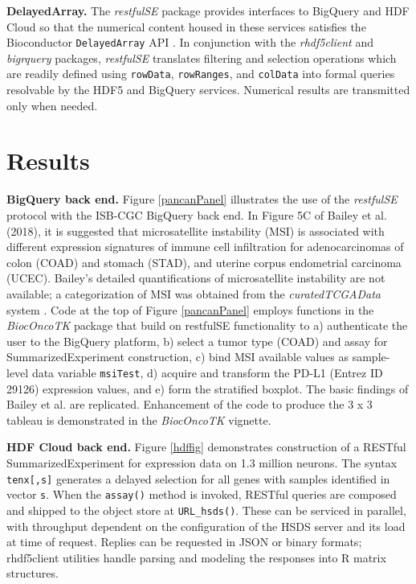 \documentclass[applications]{gen-bioinformatics}
\newcommand{\Rpackage}[1]{{\textit{#1}}}
\begin{document}
\noindent
\textbf{DelayedArray.}
The \Rpackage{restfulSE} package provides interfaces to 
BigQuery and HDF Cloud so that 
the numerical content housed in these services
satisfies the Bioconductor \verb+DelayedArray+ API \citep{Pages2018}.  
In conjunction with the \Rpackage{rhdf5client} and \Rpackage{bigrquery} packages,
\Rpackage{restfulSE} translates filtering and selection operations
which are readily defined using \verb+rowData+, \verb+rowRanges+,
and \verb+colData+ into formal queries resolvable by the HDF5 and
BigQuery services.  Numerical results are transmitted only when needed.

\section*{Results}

\textbf{BigQuery back end.} Figure \ref{pancanPanel} illustrates the 
use of the \Rpackage{restfulSE} protocol
with the ISB-CGC BigQuery back end.  In Figure 5C
of Bailey et al. (2018), it is suggested that
microsatellite instability (MSI) is associated with
different expression signatures of immune cell infiltration
for adenocarcinomas of colon (COAD) and stomach (STAD), and
uterine corpus endometrial carcinoma (UCEC).  Bailey's
detailed quantifications of microsatellite instability
are not available; a categorization of MSI was
obtained from the \Rpackage{curatedTCGAData} system \citep{Ramos2017}.
Code at the top of Figure \ref{pancanPanel} employs
functions in the \Rpackage{BiocOncoTK} package that build on
restfulSE functionality to a) authenticate the
user to the BigQuery platform, b) select a tumor
type (COAD) and assay for SummarizedExperiment
construction, c) bind MSI available values as
sample-level data variable \verb+msiTest+, d)
acquire and transform the PD-L1 
(Entrez ID 29126)
expression values, and e) form the stratified boxplot. 
The basic findings of Bailey et al. are replicated.
Enhancement of the code to produce the 3 x 3 tableau
is demonstrated in the \Rpackage{BiocOncoTK} vignette.

\noindent
\textbf{HDF Cloud back end.}  Figure \ref{hdffig}
demonstrates construction of a RESTful SummarizedExperiment
for expression data on 1.3 million neurons.
The syntax \verb+tenx[,s]+ generates a delayed selection for
all genes with samples 
identified in vector \verb+s+.  When the \verb+assay()+
method is invoked, RESTful queries are composed and
shipped to the object store at \verb+URL_hsds()+.
These can be serviced in parallel, with
throughput dependent on the configuration
of the HSDS server and its load at time of request.
Replies can be requested in JSON or binary formats;
rhdf5client utilities handle parsing and modeling the
responses into R matrix structures.
\end{document}

